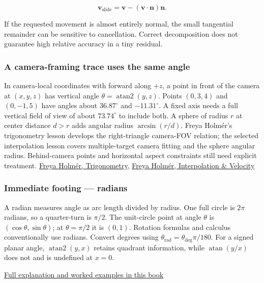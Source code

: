 \[
\mathbf v_{\mathrm{slide}}=\mathbf v-(\mathbf v\cdot\mathbf n)\mathbf n.
\]

If the requested movement is almost entirely normal, the small tangential remainder can be sensitive to cancellation. Correct decomposition does not guarantee high relative accuracy in a tiny residual.

\subsubsection{A camera-framing trace uses the same angle}\label{01-foundations-i-ch017-a-camera-framing-trace-uses-the-same-angle}

In camera-local coordinates with forward along \(+z\), a point in front of the camera at \((x,y,z)\) has vertical angle \(\theta=\operatorname{atan2}(y,z)\). Points \((0,3,4)\) and \((0,-1,5)\) have angles about \(36.87^\circ\) and \(-11.31^\circ\). A fixed axis needs a full vertical field of view of about \(73.74^\circ\) to include both. A sphere of radius \(r\) at center distance \(d>r\) adds angular radius \(\arcsin(r/d)\). Freya Holmér's trigonometry lesson develops the right-triangle camera-FOV relation; the selected interpolation lesson covers multiple-target camera fitting and the sphere angular radius. Behind-camera points and horizontal aspect constraints still need explicit treatment. \href{https://www.youtube.com/watch?v=1NLekEd770w}{Freya Holmér, Trigonometry}, \href{https://www.youtube.com/watch?v=-Ii3MrJFBkQ}{Freya Holmér, Interpolation \& Velocity}

\subsubsection{Immediate footing --- radians}\label{01-foundations-i-ch017-immediate-footing-radians}

A radian measures angle as arc length divided by radius. One full circle is \(2\pi\) radians, so a quarter-turn is \(\pi/2\). The unit-circle point at angle \(\theta\) is \((\cos\theta,\sin\theta)\); at \(\theta=\pi/2\) it is \((0,1)\). Rotation formulas and calculus conventionally use radians. Convert degrees using \(\theta_{\mathrm{rad}}=\theta_{\mathrm{deg}}\pi/180\). For a signed planar angle, \(\operatorname{atan2}(y,x)\) retains quadrant information, while \(\operatorname{atan}(y/x)\) does not and is undefined at \(x=0\).

\hyperref[01-foundations-i-ch017-rotation-first-becomes-understandable-in-a-plane]{Full explanation and worked examples in this book}

